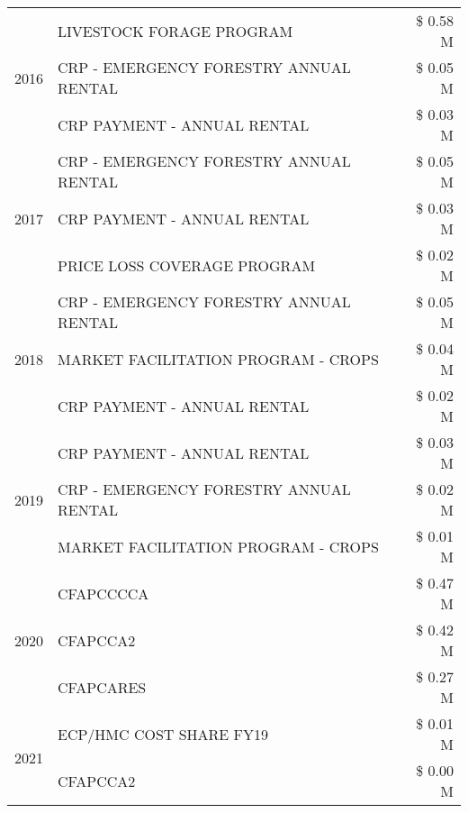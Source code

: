 \begin{tabular}{llr}
\cline{1-3}
\multirow[t]{3}{*}{2016} & LIVESTOCK FORAGE PROGRAM & \$ 0.58 M \\
 & CRP - EMERGENCY FORESTRY ANNUAL RENTAL & \$ 0.05 M \\
 & CRP PAYMENT - ANNUAL RENTAL & \$ 0.03 M \\
\cline{1-3}
\multirow[t]{3}{*}{2017} & CRP - EMERGENCY FORESTRY ANNUAL RENTAL & \$ 0.05 M \\
 & CRP PAYMENT - ANNUAL RENTAL & \$ 0.03 M \\
 & PRICE LOSS COVERAGE PROGRAM & \$ 0.02 M \\
\cline{1-3}
\multirow[t]{3}{*}{2018} & CRP - EMERGENCY FORESTRY ANNUAL RENTAL & \$ 0.05 M \\
 & MARKET FACILITATION PROGRAM - CROPS & \$ 0.04 M \\
 & CRP PAYMENT - ANNUAL RENTAL & \$ 0.02 M \\
\cline{1-3}
\multirow[t]{3}{*}{2019} & CRP PAYMENT - ANNUAL RENTAL & \$ 0.03 M \\
 & CRP - EMERGENCY FORESTRY ANNUAL RENTAL & \$ 0.02 M \\
 & MARKET FACILITATION PROGRAM - CROPS & \$ 0.01 M \\
\cline{1-3}
\multirow[t]{3}{*}{2020} & CFAPCCCCA & \$ 0.47 M \\
 & CFAPCCA2 & \$ 0.42 M \\
 & CFAPCARES & \$ 0.27 M \\
\cline{1-3}
\multirow[t]{2}{*}{2021} & ECP/HMC COST SHARE FY19 & \$ 0.01 M \\
 & CFAPCCA2 & \$ 0.00 M \\
\cline{1-3}
\bottomrule
\end{tabular}
